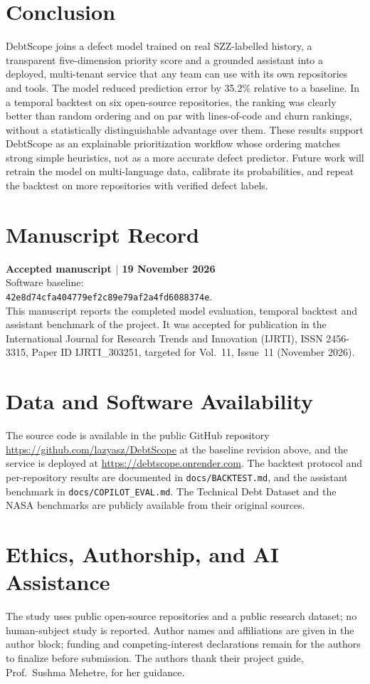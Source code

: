 \documentclass[conference]{IEEEtran}
\begin{document}
\section{Conclusion}
DebtScope joins a defect model trained on real SZZ-labelled history, a transparent five-dimension priority score and a grounded assistant into a deployed, multi-tenant service that any team can use with its own repositories and tools. The model reduced prediction error by 35.2\% relative to a baseline. In a temporal backtest on six open-source repositories, the ranking was clearly better than random ordering and on par with lines-of-code and churn rankings, without a statistically distinguishable advantage over them. These results support DebtScope as an explainable prioritization workflow whose ordering matches strong simple heuristics, not as a more accurate defect predictor. Future work will retrain the model on multi-language data, calibrate its probabilities, and repeat the backtest on more repositories with verified defect labels.

\section*{Manuscript Record}
\textbf{Accepted manuscript $|$ 19 November 2026}\\
Software baseline:\\{\footnotesize\texttt{42e8d74cfa404779ef2c89e79af2a4fd6088374e}}.\\This manuscript reports the completed model evaluation, temporal backtest and assistant benchmark of the project. It was accepted for publication in the International Journal for Research Trends and Innovation (IJRTI), ISSN 2456-3315, Paper ID IJRTI\_303251, targeted for Vol.~11, Issue~11 (November 2026).

\section*{Data and Software Availability}
The source code is available in the public GitHub repository \url{https://github.com/lazyasz/DebtScope} at the baseline revision above, and the service is deployed at \url{https://debtscope.onrender.com}. The backtest protocol and per-repository results are documented in \texttt{docs/BACKTEST.md}, and the assistant benchmark in \texttt{docs/COPILOT\_EVAL.md}. The Technical Debt Dataset and the NASA benchmarks are publicly available from their original sources.

\section*{Ethics, Authorship, and AI Assistance}
The study uses public open-source repositories and a public research dataset; no human-subject study is reported. Author names and affiliations are given in the author block; funding and competing-interest declarations remain for the authors to finalize before submission. The authors thank their project guide, Prof.\ Sushma Mehetre, for her guidance.
\end{document}
